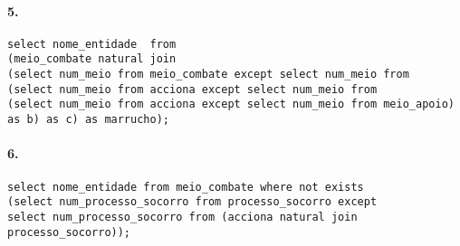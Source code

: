 \documentclass[12pt,a4paper]{article}
\begin{document}
\paragraph{5.}
\begin{verbatim}
select nome_entidade  from 
(meio_combate natural join 
(select num_meio from meio_combate except select num_meio from  
(select num_meio from acciona except select num_meio from 
(select num_meio from acciona except select num_meio from meio_apoio) as b) as c) as marrucho);
\end{verbatim}

\paragraph{6.}
\begin{verbatim}
select nome_entidade from meio_combate where not exists 
(select num_processo_socorro from processo_socorro except 
select num_processo_socorro from (acciona natural join processo_socorro));
\end{verbatim}
\end{document}
